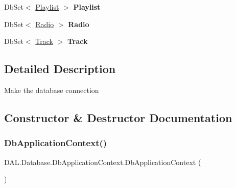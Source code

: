 \begin{DoxyCompactItemize}
Db\+Set$<$ \hyperlink{class_d_t_o_1_1_entity_1_1_playlist}{Playlist} $>$ {\bfseries Playlist}
\item 
\mbox{\label{class_d_a_l_1_1_database_1_1_db_application_context_a0d4bed5881215bd8fee58bf0dad84678}} 
Db\+Set$<$ \hyperlink{class_d_t_o_1_1_entity_1_1_radio}{Radio} $>$ {\bfseries Radio}
\item 
\mbox{\label{class_d_a_l_1_1_database_1_1_db_application_context_a3bce93761d2ab70e58a64da87675a80c}} 
Db\+Set$<$ \hyperlink{class_d_t_o_1_1_entity_1_1_track}{Track} $>$ {\bfseries Track}
\end{DoxyCompactItemize}


\subsection{Detailed Description}
Make the database connection 



\subsection{Constructor \& Destructor Documentation}
\mbox{\label{class_d_a_l_1_1_database_1_1_db_application_context_ab5a2eb81194b1c06a325186fb3e5dbb1}} 
\subsubsection{\texorpdfstring{Db\+Application\+Context()}{DbApplicationContext()}}
{\footnotesize\ttfamily D\+A\+L.\+Database.\+Db\+Application\+Context.\+Db\+Application\+Context (\begin{DoxyParamCaption}{ }\end{DoxyParamCaption})}



